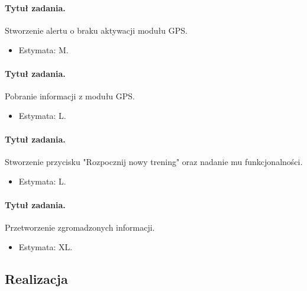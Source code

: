 \documentclass[a4paper]{article}
\begin{document}
\paragraph{Tytuł zadania.} Stworzenie alertu o braku aktywacji modułu GPS.
\begin{itemize}
\item Estymata: M.
\end{itemize}

\paragraph{Tytuł zadania.} Pobranie informacji z modułu GPS.
\begin{itemize}
\item Estymata: L.
\end{itemize}

\paragraph{Tytuł zadania.} Stworzenie przycisku "Rozpocznij nowy trening" oraz nadanie mu funkcjonalności.
\begin{itemize}
\item Estymata: L.
\end{itemize}

\paragraph{Tytuł zadania.} Przetworzenie zgromadzonych informacji.
\begin{itemize}
\item Estymata: XL.
\end{itemize}

\subsection{Realizacja}
\end{document}
